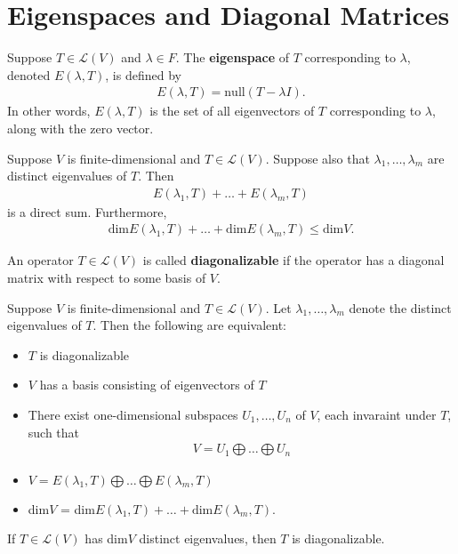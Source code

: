 \documentclass{memoir}
\begin{document}
\section{Eigenspaces and Diagonal Matrices}
\label{cha:eigenspaces_and_diagonal_matrices}
\begin{defn}[Eigenspace]
	
Suppose $T \in \mathcal{L}(V)$ and $\lambda\in F$. The \textbf{eigenspace} of $T$ corresponding to $\lambda$, denoted $E(\lambda,T)$, is defined by 
\begin{align*}
	E(\lambda,T) = \textrm{null}(T-\lambda I).
\end{align*}
In other words, $E(\lambda,T)$ is the set of all eigenvectors of $T$ corresponding to $\lambda$, along with the zero vector.
\end{defn}
\begin{cor}
	Suppose $V$ is finite-dimensional and $T \in \mathcal{L}(V)$. Suppose also that $\lambda_1,\ldots,\lambda_m$ are distinct eigenvalues of $T$. Then
	\begin{align*}
		E(\lambda_1,T) + \ldots + E(\lambda_m,T)
	\end{align*}
	is a direct sum. Furthermore,
	\begin{align*}
		\textrm{dim} E(\lambda_1,T) + \ldots + \textrm{dim} E(\lambda_m,T) \leq \textrm{dim} V.
	\end{align*}
\end{cor}
\begin{defn}[Diagonalizable]
	An operator $T\in \mathcal{L}(V)$ is called \textbf{diagonalizable} if the operator has a diagonal matrix with respect to some basis of $V$.
\end{defn}
\begin{thm}
	Suppose $V$ is finite-dimensional and $T \in \mathcal{L}(V)$. Let $\lambda_1,\ldots,\lambda_m$ denote the distinct eigenvalues of $T$. Then the following are equivalent:
	\begin{itemize}
		\item $T$ is diagonalizable 
		\item $V$ has a basis consisting of eigenvectors of $T$ 
		\item There exist one-dimensional subspaces $U_1,\ldots,U_n$ of $V$, each invaraint under $T$, such that
			\begin{align*}
				V = U_1 \bigoplus \ldots \bigoplus U_n 
			\end{align*}
		\item $V = E(\lambda_1,T) \bigoplus \ldots \bigoplus E(\lambda_m,T)$ 
		\item \textrm{dim}$V$ = \textrm{dim}$E(\lambda_1,T) + \ldots + \textrm{dim}E(\lambda_m,T)$.
	\end{itemize}
\end{thm}
\begin{cor}
	If $T \in \mathcal{L}(V)$  has \textrm{dim}$V$ distinct eigenvalues, then $T$ is diagonalizable.
\end{cor}
\end{document}
